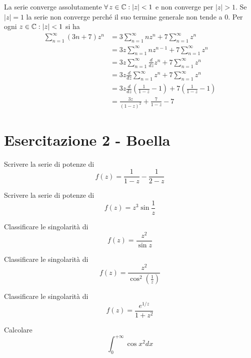 La serie converge assolutamente $\forall z\in \CC :\left| z\right| < 1$ e non converge per $\left| z\right| > 1$. Se $\left| z\right| = 1$ la serie non converge perché il suo termine generale non tende a $0$. Per ogni $z\in \mathbb{C} :\left| z\right| < 1$ si ha
\begin{align*}
\sum\limits^{\infty}_{n = 1}\left(3n + 7\right) z^{n} & = 3\sum\limits^{\infty}_{n = 1} nz^{n} + 7\sum\limits^{\infty}_{n = 1} z^{n}\\
 & = 3z\sum\limits^{\infty}_{n = 1} nz^{n - 1} + 7\sum\limits^{\infty}_{n = 1} z^{n}\\
 & = 3z\sum\limits^{\infty}_{n = 1}\frac{d}{dz} z^{n} + 7\sum\limits^{\infty}_{n = 1} z^{n}\\
 & = 3z\frac{d}{dz}\sum\limits^{\infty}_{n = 1} z^{n} + 7\sum\limits^{\infty}_{n = 1} z^{n}\\
 & = 3z\frac{d}{dz}\left(\frac{1}{1 - z} - 1\right) + 7\left(\frac{1}{1 - z} - 1\right)\\
 & = \frac{3z}{\left(1 - z\right)^{2}} + \frac{7}{1 - z} - 7
\end{align*}
\chapter{Esercitazione 2 - Boella}
\ParteEsercizi
\Esercizio{}

Scrivere la serie di potenze di
\begin{equation*}
f(z) = \frac{1}{1 - z} - \frac{1}{2 - z}
\end{equation*}
\Esercizio{}

Scrivere la serie di potenze di
\begin{equation*}
f(z) = z^{3}\sin\frac{1}{z}
\end{equation*}
\Esercizio{}

Classificare le singolarità di
\begin{equation*}
f(z) = \frac{z^{2}}{\sin z}
\end{equation*}
\Esercizio{}

Classificare le singolarità di
\begin{equation*}
f(z) = \frac{z^{2}}{\cos^{2}\left(\frac{1}{z}\right)}
\end{equation*}
\Esercizio{}

Classificare le singolarità di
\begin{equation*}
f(z) = \frac{e^{1/z}}{1 + z^{2}}
\end{equation*}

Calcolare
\begin{equation*}
\int^{+ \infty}_{0}\cos x^{2} dx
\end{equation*}
\ParteSoluzioni
\Soluzione

